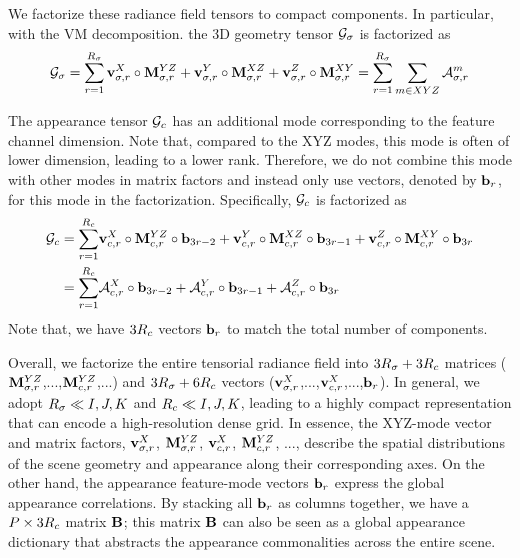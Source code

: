 \documentclass[runningheads]{llncs}
\begin{document}
We factorize these radiance field tensors to compact components. In particular, with the VM decomposition. the 3D geometry tensor $\mathcal{G}_\sigma$ is factorized as 
\begin{align}
    \mathcal{G}_{\sigma} = \sum_{r=1}^{R_\sigma} \mathbf{v}_{\sigma, r}^{X} \circ \mathbf{M}_{\sigma,r}^{YZ} + \mathbf{v}_{\sigma,r}^{Y} \circ \mathbf{M}_{\sigma,r}^{XZ} + \mathbf{v}_{\sigma,r}^{Z} \circ \mathbf{M}_{\sigma,r}^{XY}
                 = \sum_{r=1}^{R_\sigma} \sum_{m\in XYZ} \mathcal{A}^m_{\sigma, r}
    \label{eqn:dense-vmr}
\end{align}



The appearance tensor $\mathcal{G}_c$ has an additional mode corresponding to the feature channel dimension. Note that, compared to the XYZ modes, this mode is often of lower dimension, leading to a lower rank. Therefore, we do not combine this mode with other modes in matrix factors and instead only use vectors, denoted by $\mathbf{b}_r$, for this mode in the factorization. 
Specifically, $\mathcal{G}_c$ is factorized as
\begin{align}
    \mathcal{G}_{c} = \sum_{r=1}^{R_c}& \mathbf{v}_{c, r}^{X} \circ \mathbf{M}_{c,r}^{YZ} \circ \mathbf{b}_{3r-2} + \mathbf{v}_{c,r}^{Y} \circ \mathbf{M}_{c,r}^{XZ} \circ \mathbf{b}_{3r-1}
    + \mathbf{v}_{c,r}^{Z} \circ \mathbf{M}_{c,r}^{XY} \circ \mathbf{b}_{3r} \notag \\
    =\sum_{r=1}^{R_c} &\mathcal{A}_{c,r}^X \circ \mathbf{b}_{3r-2} +\mathcal{A}_{c,r}^Y \circ \mathbf{b}_{3r-1} +\mathcal{A}_{c,r}^Z \circ \mathbf{b}_{3r}
    \label{eqn:rad-vmr}
\end{align}
Note that, we have $3R_c$ vectors $\mathbf{b}_r$ to match the total number of components.


Overall, we factorize the entire tensorial radiance field into $3R_\sigma+3R_c$ matrices ($\mathbf{M}_{\sigma,r}^{YZ}$,$...$,$\mathbf{M}_{c,r}^{YZ}$,...) and $3R_\sigma+6R_c$ vectors ($\mathbf{v}_{\sigma, r}^{X}$,...,$\mathbf{v}_{c, r}^{X}$,...,$\mathbf{b}_r$). 
In general, we adopt $R_\sigma \ll I, J, K$ and $R_c \ll I, J, K$, leading to a highly compact representation that can encode a high-resolution dense grid.
In essence, the XYZ-mode vector and matrix factors, $\mathbf{v}_{\sigma, r}^{X}$, $\mathbf{M}_{\sigma,r}^{YZ}$, $\mathbf{v}_{c, r}^{X}$, $\mathbf{M}_{c,r}^{YZ}$, ..., describe the spatial distributions of the scene geometry and appearance along their corresponding axes. 
On the other hand, the appearance feature-mode vectors $\mathbf{b}_r$ express the global appearance correlations.
By stacking all $\mathbf{b}_r$ as columns together, we have a $P\times 3R_c$ matrix $\mathbf{B}$; this matrix $\mathbf{B}$ can also be seen as a global appearance dictionary that abstracts the appearance commonalities across the entire scene. 
\end{document}
